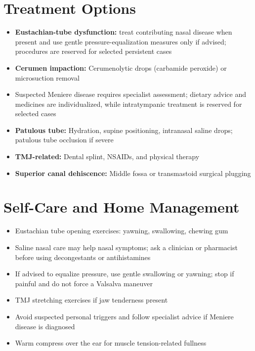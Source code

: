 \section*{Treatment Options}
\begin{itemize}
  \item \textbf{Eustachian-tube dysfunction:} treat contributing nasal disease when present and use gentle pressure-equalization measures only if advised; procedures are reserved for selected persistent cases
  \item \textbf{Cerumen impaction:} Cerumenolytic drops (carbamide peroxide) or microsuction removal
  \item Suspected Meniere disease requires specialist assessment; dietary advice and medicines are individualized, while intratympanic treatment is reserved for selected cases
  \item \textbf{Patulous tube:} Hydration, supine positioning, intranasal saline drops; patulous tube occlusion if severe
  \item \textbf{TMJ-related:} Dental splint, NSAIDs, and physical therapy
  \item \textbf{Superior canal dehiscence:} Middle fossa or transmastoid surgical plugging
\end{itemize}

\section*{Self-Care and Home Management}
\begin{itemize}
  \item Eustachian tube opening exercises: yawning, swallowing, chewing gum
  \item Saline nasal care may help nasal symptoms; ask a clinician or pharmacist before using decongestants or antihistamines
  \item If advised to equalize pressure, use gentle swallowing or yawning; stop if painful and do not force a Valsalva maneuver
  \item TMJ stretching exercises if jaw tenderness present
  \item Avoid suspected personal triggers and follow specialist advice if Meniere disease is diagnosed
  \item Warm compress over the ear for muscle tension-related fullness
\end{itemize}

